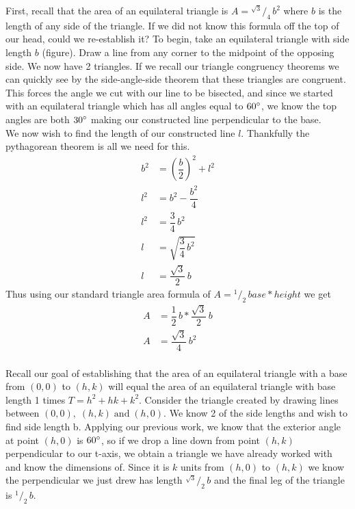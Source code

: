 \documentclass[12pt,letter]{article}
\newcommand*\rfrac[2]{{}^{#1}\!/_{#2}}
\begin{document}
First, recall that the area of an equilateral triangle is $A = \rfrac {\sqrt{3}} {4} \, b^2$ where $b$ is the length of any side of the triangle. If we did not know this formula off the top of our head, could we re-establish it? To begin, take an equilateral triangle with side length $b$ (figure). Draw a line from any corner to the midpoint of the opposing side. We now have 2 triangles. If we recall our triangle congruency theorems we can quickly see by the side-angle-side theorem that these triangles are congruent. This forces the angle we cut with our line to be bisected, and since we started with an equilateral triangle which has all angles equal to $60\degree$, we know the top angles are both $30\degree$ making our constructed line perpendicular to the base. \\

We now wish to find the length of our constructed line $l$. Thankfully the pythagorean theorem is all we need for this.
\begin{align*}
b^2 &= \left(\dfrac{b} {2}\right)^2 + l^2 \\
l^2 &= b^2 - \dfrac{b^2} {4} \\
l^2 &= \dfrac{3} {4} \, b^2 \\
l &= \sqrt{\dfrac{3} {4} \, b^2} \\
l &= \dfrac{\sqrt{3}} {2} \, b
\end{align*}
Thus using our standard triangle area formula of $A = \rfrac{1} {2} \, base * height$ we get
\begin{align*}
A &= \dfrac{1} {2} \, b * \dfrac{\sqrt{3}} {2} \, b \\
A &= \dfrac{\sqrt{3}} {4} \, b^2
\end{align*} \\

Recall our goal of establishing that the area of an equilateral triangle with a base from $(0,0)$ to $(h,k)$ will equal the area of an equilateral triangle with base length 1 times $T = h^2 + hk + k^2$. Consider the triangle created by drawing lines between $(0,0), \; (h,k) \; \text{and} \; (h,0)$. We know 2 of the side lengths and wish to find side length b. Applying our previous work, we know that the exterior angle at point $(h,0)$ is $60\degree$, so if we drop a line down from point $(h,k)$ perpendicular to our t-axis, we obtain a triangle we have already worked with and know the dimensions of. Since it is $k$ units from $(h,0)$ to $(h,k)$ we know the perpendicular we just drew has length $\rfrac{\sqrt{3}} {2} \, b$ and the final leg of the triangle is $\rfrac 1 2 \, b$.
\end{document}
